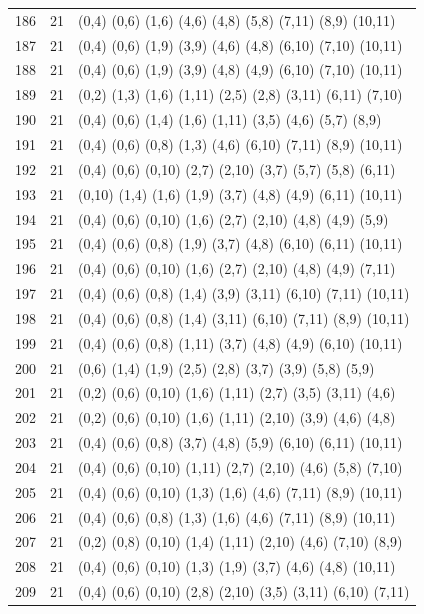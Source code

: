 {\begin{longtable}{lll}
186 & 21 & (0,4) (0,6) (1,6) (4,6) (4,8) (5,8) (7,11) (8,9) (10,11) \\
187 & 21 & (0,4) (0,6) (1,9) (3,9) (4,6) (4,8) (6,10) (7,10) (10,11) \\
188 & 21 & (0,4) (0,6) (1,9) (3,9) (4,8) (4,9) (6,10) (7,10) (10,11) \\
189 & 21 & (0,2) (1,3) (1,6) (1,11) (2,5) (2,8) (3,11) (6,11) (7,10) \\
190 & 21 & (0,4) (0,6) (1,4) (1,6) (1,11) (3,5) (4,6) (5,7) (8,9) \\
191 & 21 & (0,4) (0,6) (0,8) (1,3) (4,6) (6,10) (7,11) (8,9) (10,11) \\
192 & 21 & (0,4) (0,6) (0,10) (2,7) (2,10) (3,7) (5,7) (5,8) (6,11) \\
193 & 21 & (0,10) (1,4) (1,6) (1,9) (3,7) (4,8) (4,9) (6,11) (10,11) \\
194 & 21 & (0,4) (0,6) (0,10) (1,6) (2,7) (2,10) (4,8) (4,9) (5,9) \\
195 & 21 & (0,4) (0,6) (0,8) (1,9) (3,7) (4,8) (6,10) (6,11) (10,11) \\
196 & 21 & (0,4) (0,6) (0,10) (1,6) (2,7) (2,10) (4,8) (4,9) (7,11) \\
197 & 21 & (0,4) (0,6) (0,8) (1,4) (3,9) (3,11) (6,10) (7,11) (10,11) \\
198 & 21 & (0,4) (0,6) (0,8) (1,4) (3,11) (6,10) (7,11) (8,9) (10,11) \\
199 & 21 & (0,4) (0,6) (0,8) (1,11) (3,7) (4,8) (4,9) (6,10) (10,11) \\
200 & 21 & (0,6) (1,4) (1,9) (2,5) (2,8) (3,7) (3,9) (5,8) (5,9) \\
201 & 21 & (0,2) (0,6) (0,10) (1,6) (1,11) (2,7) (3,5) (3,11) (4,6) \\
202 & 21 & (0,2) (0,6) (0,10) (1,6) (1,11) (2,10) (3,9) (4,6) (4,8) \\
203 & 21 & (0,4) (0,6) (0,8) (3,7) (4,8) (5,9) (6,10) (6,11) (10,11) \\
204 & 21 & (0,4) (0,6) (0,10) (1,11) (2,7) (2,10) (4,6) (5,8) (7,10) \\
205 & 21 & (0,4) (0,6) (0,10) (1,3) (1,6) (4,6) (7,11) (8,9) (10,11) \\
206 & 21 & (0,4) (0,6) (0,8) (1,3) (1,6) (4,6) (7,11) (8,9) (10,11) \\
207 & 21 & (0,2) (0,8) (0,10) (1,4) (1,11) (2,10) (4,6) (7,10) (8,9) \\
208 & 21 & (0,4) (0,6) (0,10) (1,3) (1,9) (3,7) (4,6) (4,8) (10,11) \\
209 & 21 & (0,4) (0,6) (0,10) (2,8) (2,10) (3,5) (3,11) (6,10) (7,11) \\

\end{longtable}}

